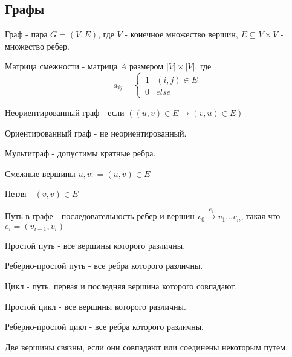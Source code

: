 \documentclass[12pt]{article}
\begin{document}
\subsection{Графы}
\begin{defn}
    Граф - пара $G = (V, E)$, где $V$ - конечное множество вершин, $E \subseteq V \times V$ - множество  ребер.
\end{defn}
 \begin{defn}
    Матрица смежности - матрица $A$ размером $|V| \times |V|$, где \[
	a_{ij} = 
	\left \{ 
	\begin{array}{ll}
	    1& (i, j) \in E\\
	    0& else
	\end{array}
	\right 
    .\] 
\end{defn}
\begin{defn}
    Неориентированный граф - если $\left ((u, v) \in  E \to (v, u) \in  E \right )$
\end{defn}
\begin{defn}
    Ориентированный граф - не неориентированный.
\end{defn}
\begin{defn}
    Мультиграф - допустимы кратные ребра.
\end{defn}
\begin{defn}
    Смежные вершины $u, v : =  (u, v) \in  E$
\end{defn}
\begin{defn}
    Петля - $(v, v) \in  E$
\end{defn}
\begin{defn}
    Путь в графе - последовательность ребер и вершин $v_0 \stackrel{e_1} \to v_1 \ldots v_n$, такая что $e_i = (v_{i-1}, v_i)$
\end{defn}
\begin{defn}
    Простой путь - все вершины которого различны.
\end{defn}
\begin{defn}
    Реберно-простой путь - все ребра которого различны.
\end{defn}
\begin{defn}
    Цикл - путь, первая и последняя вершина которого совпадают.
\end{defn}
\begin{defn}
    Простой цикл - все вершины которого различны.
\end{defn}
\begin{defn}
    Реберно-простой цикл - все ребра которого различны.
\end{defn}
\begin{defn}
    Две вершины связны, если они совпадают или соединены некоторым путем.
\end{defn}
\end{document}
